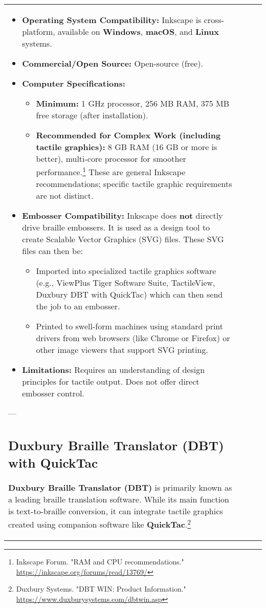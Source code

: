 \begin{longtable}{|l|l|l|l|}
{\begin{itemize}
    \item \textbf{Operating System Compatibility:} Inkscape is cross-platform, available on \textbf{Windows}, \textbf{macOS}, and \textbf{Linux} systems.
    \item \textbf{Commercial/Open Source:} Open-source (free).
    \item \textbf{Computer Specifications:}
    \begin{itemize}
        \item \textbf{Minimum:} 1 GHz processor, 256 MB RAM, 375 MB free storage (after installation).
        \item \textbf{Recommended for Complex Work (including tactile graphics):} 8 GB RAM (16 GB or more is better), multi-core processor for smoother performance.\footnote{Inkscape Forum. "RAM and CPU recommendations." \url{https://inkscape.org/forums/read/13769/}} These are general Inkscape recommendations; specific tactile graphic requirements are not distinct.
    \end{itemize}
    \item \textbf{Embosser Compatibility:} Inkscape does \textbf{not} directly drive braille embossers. It is used as a design tool to create Scalable Vector Graphics (SVG) files. These SVG files can then be:
    \begin{itemize}
        \item Imported into specialized tactile graphics software (e.g., ViewPlus Tiger Software Suite, TactileView, Duxbury DBT with QuickTac) which can then send the job to an embosser.
        \item Printed to swell-form machines using standard print drivers from web browsers (like Chrome or Firefox) or other image viewers that support SVG printing.
    \end{itemize}
    \item \textbf{Limitations:} Requires an understanding of design principles for tactile output. Does not offer direct embosser control.
\end{itemize}

---

\subsection{Duxbury Braille Translator (DBT) with QuickTac}
\textbf{Duxbury Braille Translator (DBT)} is primarily known as a leading braille translation software. While its main function is text-to-braille conversion, it can integrate tactile graphics created using companion software like \textbf{QuickTac}.\footnote{Duxbury Systems. "DBT WIN: Product Information." \url{https://www.duxburysystems.com/dbtwin.asp}}

}
\end{longtable}
